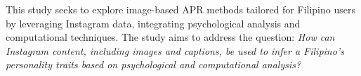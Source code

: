 

This study seeks to explore image-based APR methods tailored for Filipino users by leveraging Instagram data, integrating psychological analysis and computational techniques. The study aims to address the question: \textit{How can Instagram content, including images and captions, be used to infer a Filipino’s personality traits based on psychological and computational analysis?}







